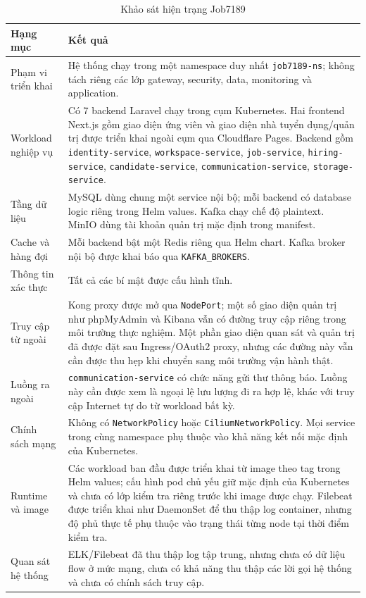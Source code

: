 \begin{table}[H]
\centering
\caption{Khảo sát hiện trạng Job7189}
\label{tab:c3_baseline_asset_risk}
\renewcommand{\arraystretch}{1.18}
\footnotesize
\TableDeployColors
\begin{tabularx}{\textwidth}{|L{0.25\textwidth}|Y|}
\hline
{}
\textbf{Hạng mục} & \textbf{Kết quả} \\
\hline
Phạm vi triển khai & Hệ thống chạy trong một namespace duy nhất \texttt{job7189-ns}; không tách riêng các lớp gateway, security, data, monitoring và application. \\
\hline
Workload nghiệp vụ & Có 7 backend Laravel chạy trong cụm Kubernetes. Hai frontend Next.js gồm giao diện ứng viên và giao diện nhà tuyển dụng/quản trị được triển khai ngoài cụm qua Cloudflare Pages. Backend gồm \texttt{identity-service}, \texttt{workspace-service}, \texttt{job-service}, \texttt{hiring-service}, \texttt{candidate-service}, \texttt{communication-service}, \texttt{storage-service}. \\
\hline
Tầng dữ liệu & MySQL dùng chung một service nội bộ; mỗi backend có database logic riêng trong Helm values. Kafka chạy chế độ plaintext. MinIO dùng tài khoản quản trị mặc định trong manifest. \\
\hline
Cache và hàng đợi & Mỗi backend bật một Redis riêng qua Helm chart. Kafka broker nội bộ được khai báo qua \texttt{KAFKA\_BROKERS}. \\
\hline
Thông tin xác thực & Tất cả các bí mật được cấu hình tĩnh. \\
\hline
Truy cập từ ngoài & Kong proxy được mở qua \texttt{NodePort}; một số giao diện quản trị như phpMyAdmin và Kibana vẫn có đường truy cập riêng trong môi trường thực nghiệm. Một phần giao diện quan sát và quản trị đã được đặt sau Ingress/OAuth2 proxy, nhưng các đường này vẫn cần được thu hẹp khi chuyển sang môi trường vận hành thật. \\
\hline
Luồng ra ngoài & \texttt{communication-service} có chức năng gửi thư thông báo. Luồng này cần được xem là ngoại lệ lưu lượng đi ra hợp lệ, khác với truy cập Internet tự do từ workload bất kỳ. \\
\hline
Chính sách mạng & Không có \texttt{NetworkPolicy} hoặc \texttt{CiliumNetworkPolicy}. Mọi service trong cùng namespace phụ thuộc vào khả năng kết nối mặc định của Kubernetes. \\
\hline
Runtime và image & Các workload ban đầu được triển khai từ image theo tag trong Helm values; cấu hình pod chủ yếu giữ mặc định của Kubernetes và chưa có lớp kiểm tra riêng trước khi image được chạy. Filebeat được triển khai như DaemonSet để thu thập log container, nhưng độ phủ thực tế phụ thuộc vào trạng thái từng node tại thời điểm kiểm tra. \\
\hline
Quan sát hệ thống & ELK/Filebeat đã thu thập log tập trung, nhưng chưa có dữ liệu flow ở mức mạng, chưa có khả năng thu thập các lời gọi hệ thống và chưa có chính sách truy cập. \\
\hline
\end{tabularx}
\end{table}

